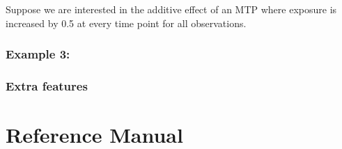 \documentclass[]{jss}
\begin{document}
Suppose we are interested in the additive effect of an MTP where exposure
is increased by 0.5 at every time point for all observations.

\hypertarget{example-3}{%
\subsubsection{Example 3:}\label{example-3}}

\hypertarget{extra-features}{%
\subsubsection{Extra features}\label{extra-features}}

\hypertarget{reference-manual}{%
\section{Reference Manual}\label{reference-manual}}

\renewcommand\refname{References}

\end{document}
